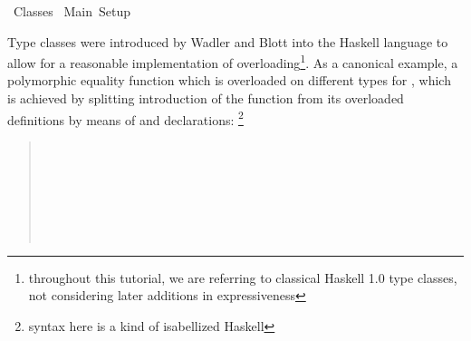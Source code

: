 %
\begin{isabellebody}%
\def\isabellecontext{Classes}%
%
\isadelimtheory
%
\endisadelimtheory
%
\isatagtheory
{}\isamarkupfalse%
\ Classes\isanewline
{}\ Main\ Setup\isanewline
{}%
\endisatagtheory
{\isafoldtheory}%
%
\isadelimtheory
%
\endisadelimtheory
%
\isamarkuptrue%
%
\begin{isamarkuptext}%
Type classes were introduced by Wadler and Blott \cite{wadler89how}
  into the Haskell language to allow for a reasonable implementation
  of overloading\footnote{throughout this tutorial, we are referring
  to classical Haskell 1.0 type classes, not considering later
  additions in expressiveness}.  As a canonical example, a polymorphic
  equality function  which is overloaded on
  different types for , which is achieved by splitting
  introduction of the  function from its overloaded
  definitions by means of  and 
  declarations: \footnote{syntax here is a kind of isabellized
  Haskell}

  \begin{quote}

  \noindent{} \\
  \hspace*{2ex}

  \medskip\noindent{} \\
  \hspace*{2ex} \\
  \hspace*{2ex} \\
  \hspace*{2ex} \\
  \hspace*{2ex}


\end{quote}
\end{isamarkuptext}
\end{isabellebody}
